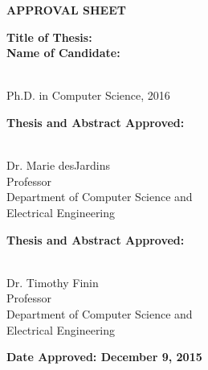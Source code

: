 \newpage
\begin{titlepage}
\vspace{0.6in}
\begin{singlespace}

\begin{center}
\vspace{0.1in}
\large{\bf APPROVAL SHEET}
\bigskip \bigskip
\end{center}

\begin{flushleft}
{\bf Title of Thesis:}{\hspace{3mm}}\thesistitle{}\\
\vspace{0.5in}
{\bf Name of Candidate:}{\hspace{3mm}} \parbox[t]{2in}{\fullname{} \\ Ph.D. in Computer Science, 2016}
\end{flushleft}

\vspace{0.5in}

\begin{flushleft}
{\bf Thesis and Abstract Approved:}{\hspace{3mm}} 
\parbox[t]{2.5in}{\underline{\hspace{2.0in}}\\ 
	Dr. Marie desJardins \\
	Professor \\
	Department of Computer Science and \\
	Electrical Engineering}
\end{flushleft}

\vspace{0.5in}

\begin{flushleft}
{\bf Thesis and Abstract Approved:}{\hspace{3mm}} 
\parbox[t]{2.5in}{\underline{\hspace{2.0in}}\\ 
	Dr. Timothy Finin \\
	Professor \\
	Department of Computer Science and \\
	Electrical Engineering}
\end{flushleft}

\vspace{0.8in}

\begin{flushleft}
{\bf Date Approved: December 9, 2015}{\hspace{3mm}} \underline{\hspace{2.5in}}\\
\end{flushleft}

\end{singlespace}
\end{titlepage}
\par\vfil
